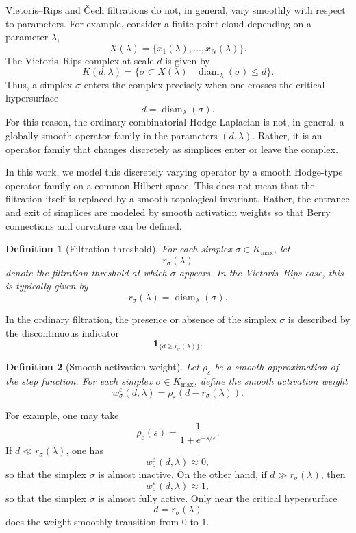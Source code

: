 \documentclass[10pt,a4paper]{amsart}
\newtheorem{definition}{Definition}%
\begin{document}
Vietoris--Rips and \v{C}ech filtrations do not, in general, vary smoothly with
respect to parameters. For example, consider a finite point cloud depending on a
parameter \(\lambda\),
\[
X(\lambda)=\{x_1(\lambda),\dots,x_N(\lambda)\}.
\]
The Vietoris--Rips complex at scale \(d\) is given by
\[
K(d,\lambda)
=
\{\sigma\subset X(\lambda)\mid \operatorname{diam}_\lambda(\sigma)\le d\}.
\]
Thus, a simplex \(\sigma\) enters the complex precisely when one crosses the
critical hypersurface
\[
d=\operatorname{diam}_\lambda(\sigma).
\]
For this reason, the ordinary combinatorial Hodge Laplacian is not, in general,
a globally smooth operator family in the parameters \((d,\lambda)\). Rather, it
is an operator family that changes discretely as simplices enter or leave the
complex.

In this work, we model this discretely varying operator by a smooth Hodge-type
operator family on a common Hilbert space. This does not mean that the filtration
itself is replaced by a smooth topological invariant. Rather, the entrance and
exit of simplices are modeled by smooth activation weights so that Berry
connections and curvature can be defined.


\begin{definition}[Filtration threshold]
For each simplex \(\sigma\in K_{\max}\), let
\[
r_\sigma(\lambda)
\]
denote the filtration threshold at which \(\sigma\) appears. In the
Vietoris--Rips case, this is typically given by
\[
r_\sigma(\lambda)=\operatorname{diam}_\lambda(\sigma).
\]
\end{definition}

In the ordinary filtration, the presence or absence of the simplex \(\sigma\) is
described by the discontinuous indicator
\[
\mathbf 1_{\{d\ge r_\sigma(\lambda)\}}.
\]

\begin{definition}[Smooth activation weight]
Let \(\rho_\varepsilon\) be a smooth approximation of the step function. 
For each simplex \(\sigma\in K_{\max}\), define the smooth activation weight
\[
w_\sigma^\varepsilon(d,\lambda)
=
\rho_\varepsilon(d-r_\sigma(\lambda)).
\]
\end{definition}

For example, one may take
\[
\rho_\varepsilon(s)
=
\frac{1}{1+e^{-s/\varepsilon}}.
\]
If \(d\ll r_\sigma(\lambda)\), one has
\[
w_\sigma^\varepsilon(d,\lambda)\approx 0,
\]
so that the simplex \(\sigma\) is almost inactive. On the other hand, if
\(d\gg r_\sigma(\lambda)\), then
\[
w_\sigma^\varepsilon(d,\lambda)\approx 1,
\]
so that the simplex \(\sigma\) is almost fully active. Only near the critical
hypersurface
\[
d=r_\sigma(\lambda)
\]
does the weight smoothly transition from \(0\) to \(1\).
\end{document}
